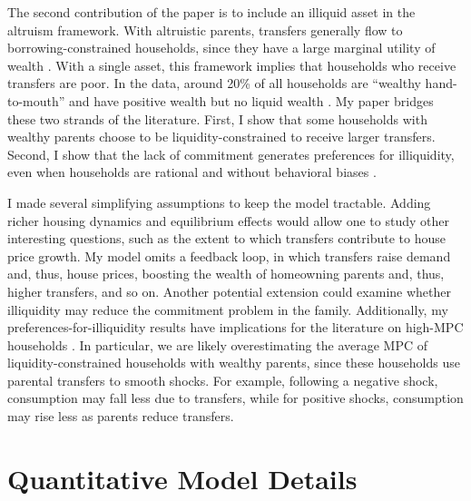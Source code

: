 \documentclass[12pt]{article}
\begin{document}
The second contribution of the paper is to include an illiquid asset in the altruism framework. With altruistic parents, transfers generally flow to borrowing-constrained households, since they have a large marginal utility of wealth \citep{Barczyk2020,Chu2020}. With a single asset, this framework implies that households who receive transfers are poor. In the data, around 20\% of all households are ``wealthy hand-to-mouth'' and have positive wealth but no liquid wealth \citep{Kaplan2014a,Attanasio2018}. My paper bridges these two strands of the literature. First, I show that some households with wealthy parents choose to be liquidity-constrained to receive larger transfers. Second, I show that the lack of commitment generates preferences for illiquidity, even when households are rational and without behavioral biases \citep[see e.g.,][]{attanasio2024temptation}. 

I made several simplifying assumptions to keep the model tractable. Adding richer housing dynamics and equilibrium effects would allow one to study other interesting questions, such as the extent to which transfers contribute to house price growth. My model omits a feedback loop, in which transfers raise demand and, thus, house prices, boosting the wealth of homeowning parents and, thus, higher transfers, and so on. Another potential extension could examine whether illiquidity may reduce the commitment problem in the family. Additionally, my preferences-for-illiquidity results have implications for the literature on high-MPC households \citep[see e.g.,][]{kaplan2022marginal}. In particular, we are likely overestimating the average MPC of liquidity-constrained households with wealthy parents, since these households use parental transfers to smooth shocks. For example, following a negative shock, consumption may fall less due to transfers, while for positive shocks, consumption may rise less as parents reduce transfers.

\newpage
\begingroup\singlespacing


\endgroup
\newpage


\appendix

\setcounter{figure}{0}
\renewcommand{\thefigure}{A\arabic{figure}}
\setcounter{table}{0}
\renewcommand{\thetable}{A\arabic{table}}

\section{Quantitative Model Details} 
\end{document}
